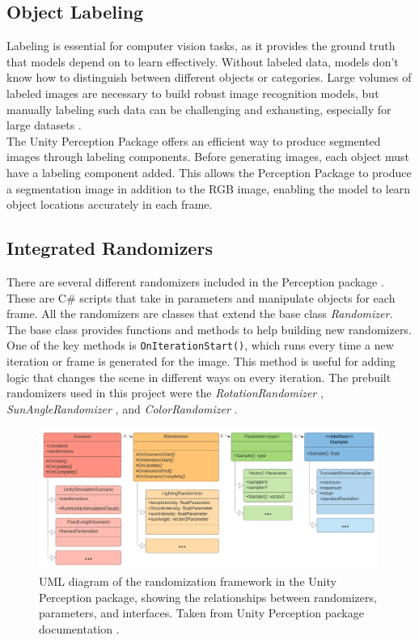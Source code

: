 \subsection{Object Labeling}
Labeling is essential for computer vision tasks, as it provides the ground truth that models depend on to learn effectively. Without labeled data, models don't know how to distinguish between different objects or categories. Large volumes of labeled images are necessary to build robust image recognition models, but manually labeling such data can be challenging and exhausting, especially for large datasets \cite{10.1007/978-3-642-15549-9_55}.\\

\noindent The Unity Perception Package offers an efficient way to produce segmented images through labeling components. Before generating images, each object must have a labeling component added. This allows the Perception Package to produce a segmentation image in addition to the RGB image, enabling the model to learn object locations accurately in each frame.



\subsection{Integrated Randomizers}
There are several different randomizers included in the Perception package \cite{unity-perception2022}. These are C\# scripts that take in parameters and manipulate objects for each frame. All the randomizers are classes that extend the base class \textit{Randomizer}. The base class provides functions and methods to help building new randomizers. One of the key methods is \texttt{OnIterationStart()}, which runs every time a new iteration or frame is generated for the image. This method is useful for adding logic that changes the scene in different ways on every iteration. The prebuilt randomizers used in this project were the \textit{RotationRandomizer} \cite{rotation_randomizer}, \textit{SunAngleRandomizer} \cite{sun_angle_randomizer}, and \textit{ColorRandomizer} \cite{color_randomizer}.

\begin{figure}[H]
    \centering
    \includegraphics[width=0.99\textwidth]{Figures/randomization_uml.png}
    \caption{UML diagram of the randomization framework in the Unity Perception package, showing the relationships between randomizers, parameters, and interfaces. Taken from Unity Perception package documentation \cite{UMLdiagram}.}
    \label{fig:randomizer class uml}
    
\end{figure}

